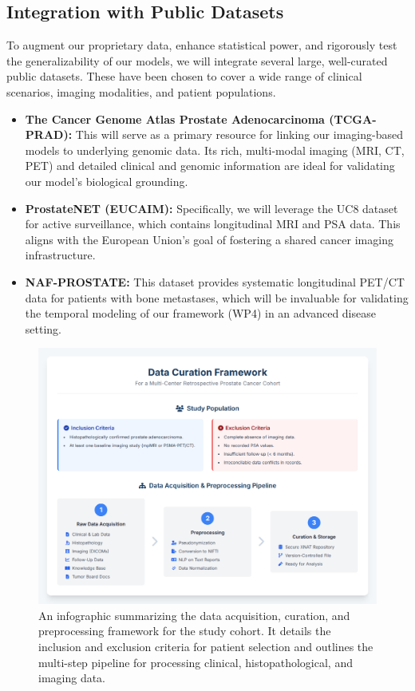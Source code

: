\documentclass[11pt, a4paper]{article}
\begin{document}
\subsection{Integration with Public Datasets}
To augment our proprietary data, enhance statistical power, and rigorously test the generalizability of our models, we will integrate several large, well-curated public datasets. These have been chosen to cover a wide range of clinical scenarios, imaging modalities, and patient populations.
\begin{itemize}
    \item \textbf{The Cancer Genome Atlas Prostate Adenocarcinoma (TCGA-PRAD):} This will serve as a primary resource for linking our imaging-based models to underlying genomic data. Its rich, multi-modal imaging (MRI, CT, PET) and detailed clinical and genomic information are ideal for validating our model's biological grounding.
    \item \textbf{ProstateNET (EUCAIM):} Specifically, we will leverage the UC8 dataset for active surveillance, which contains longitudinal MRI and PSA data. This aligns with the European Union's goal of fostering a shared cancer imaging infrastructure.
    \item \textbf{NAF-PROSTATE:} This dataset provides systematic longitudinal PET/CT data for patients with bone metastases, which will be invaluable for validating the temporal modeling of our framework (WP4) in an advanced disease setting.
\end{itemize}

\begin{figure}[H]
        \centering
        \includegraphics[width=\textwidth]{dc.png}
        \caption{An infographic summarizing the data acquisition, curation, and preprocessing framework for the study cohort. It details the inclusion and exclusion criteria for patient selection and outlines the multi-step pipeline for processing clinical, histopathological, and imaging data.}
        \label{fig:data_curation}
\end{figure}
\end{document}

